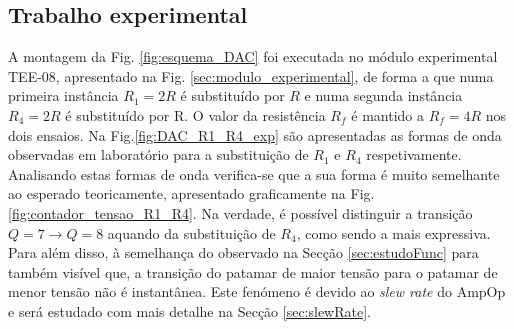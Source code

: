 \documentclass[a4paper, oneside]{article}
\begin{document}
\subsection{Trabalho experimental}
A montagem da Fig. \ref{fig:esquema_DAC} foi executada  no módulo experimental TEE-08, apresentado na Fig. \ref{sec:modulo_experimental}, de forma a que numa primeira instância $R_1 = 2R$ é substituído por $R$ e numa segunda instância $R_4 = 2R$ é substituído por R. O valor da resistência $R_f$ é mantido a $R_f = 4R$ nos dois ensaios. Na Fig.\ref{fig:DAC_R1_R4_exp} são apresentadas as formas de onda observadas em laboratório para a substituição de $R_1$ e $R_4$ respetivamente. Analisando estas formas de onda verifica-se que a sua forma é muito semelhante ao esperado teoricamente, apresentado graficamente na Fig. \ref{fig:contador_tensao_R1_R4}. Na verdade, é possível distinguir a transição $Q=7\rightarrow Q=8$ aquando da substituição de $R_4$, como sendo a mais expressiva. Para além disso, à semelhança do observado na Secção \ref{sec:estudoFunc} para  também visível que, a transição do patamar de maior tensão para o patamar de menor tensão não é instantânea. Este fenómeno é devido ao \textit{slew rate} do AmpOp e será estudado com mais detalhe na Secção \ref{sec:slewRate}.
\end{document}
